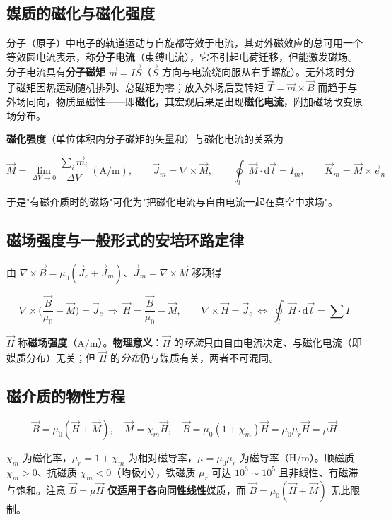 \subsection{媒质的磁化与磁化强度}
分子（原子）中电子的轨道运动与自旋都等效于电流，其对外磁效应的总可用一个等效圆电流表示，称\textbf{分子电流}（束缚电流），它不引起电荷迁移，但能激发磁场。分子电流具有\textbf{分子磁矩} $\vec{m}=I\vec{S}$（$\vec{S}$ 方向与电流绕向服从右手螺旋）。无外场时分子磁矩因热运动随机排列、总磁矩为零；放入外场后受转矩 $\vec{T}=\vec{m}\times\vec{B}$ 而趋于与外场同向，物质显磁性——即\textbf{磁化}，其宏观后果是出现\textbf{磁化电流}，附加磁场改变原场分布。

\textbf{磁化强度}（单位体积内分子磁矩的矢量和）与磁化电流的关系为
\begin{formulaBox}
\[
\vec{M}=\lim_{\Delta V\to 0}\frac{\sum_i\vec{m}_i}{\Delta V}\ (\mathrm{A/m}),
\qquad
\vec{J}_m=\nabla\times\vec{M},
\qquad
\oint_l\vec{M}\cdot\mathrm{d}\vec{l}=I_m,
\qquad
\vec{K}_m=\vec{M}\times\vec{e}_n
\]
\end{formulaBox}
于是"有磁介质时的磁场"可化为"把磁化电流与自由电流一起在真空中求场"。

\subsection{磁场强度与一般形式的安培环路定律}
由 $\nabla\times\vec{B}=\mu_0(\vec{J}_c+\vec{J}_m)$、$\vec{J}_m=\nabla\times\vec{M}$ 移项得
\begin{formulaBox}
\[
\nabla\times\Big(\frac{\vec{B}}{\mu_0}-\vec{M}\Big)=\vec{J}_c
\ \Longrightarrow\
\vec{H}=\frac{\vec{B}}{\mu_0}-\vec{M},
\qquad
\nabla\times\vec{H}=\vec{J}_c
\ \Longleftrightarrow\
\oint_l\vec{H}\cdot\mathrm{d}\vec{l}=\sum I
\]
\end{formulaBox}
$\vec{H}$ 称\textbf{磁场强度}（$\mathrm{A/m}$）。\textbf{物理意义}：$\vec{H}$ 的\emph{环流}只由自由电流决定、与磁化电流（即媒质分布）无关；但 $\vec{H}$ 的\emph{分布}仍与媒质有关，两者不可混同。

\subsection{磁介质的物性方程}
\begin{formulaBox}
\[
\vec{B}=\mu_0(\vec{H}+\vec{M}),
\quad
\vec{M}=\chi_m\vec{H},
\quad
\vec{B}=\mu_0(1+\chi_m)\vec{H}=\mu_0\mu_r\vec{H}=\mu\vec{H}
\]
\end{formulaBox}
$\chi_m$ 为磁化率，$\mu_r=1+\chi_m$ 为相对磁导率，$\mu=\mu_0\mu_r$ 为磁导率（$\mathrm{H/m}$）。顺磁质 $\chi_m>0$、抗磁质 $\chi_m<0$（均极小），铁磁质 $\mu_r$ 可达 $10^3\sim10^5$ 且非线性、有磁滞与饱和。注意 $\vec{B}=\mu\vec{H}$ \textbf{仅适用于各向同性线性}媒质，而 $\vec{B}=\mu_0(\vec{H}+\vec{M})$ 无此限制。

